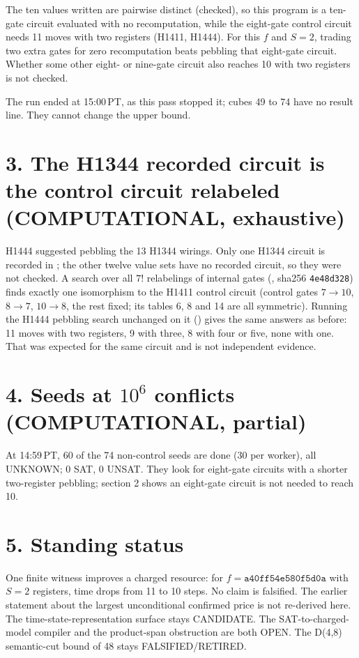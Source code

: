 \documentclass[11pt]{article}
\begin{document}
The ten values written are pairwise distinct (checked), so this program is a ten-gate circuit evaluated with no recomputation, while the eight-gate control circuit needs 11 moves with two registers (H1411, H1444). For this $f$ and $S=2$, trading two extra gates for zero recomputation beats pebbling that eight-gate circuit. Whether some other eight- or nine-gate circuit also reaches 10 with two registers is not checked.

The run ended at 15:00\,PT, as this pass stopped it; cubes 49 to 74 have no result line. They cannot change the upper bound.

\section*{3. The H1344 recorded circuit is the control circuit relabeled (COMPUTATIONAL, exhaustive)}
H1444 suggested pebbling the 13 H1344 wirings. Only one H1344 circuit is recorded in ; the other twelve value sets have no recorded circuit, so they were not checked. A search over all $7!$ relabelings of internal gates (, sha256 \texttt{4e48d328}) finds exactly one isomorphism to the H1411 control circuit (control gates $7\to10$, $8\to7$, $10\to8$, the rest fixed; its tables 6, 8 and 14 are all symmetric). Running the H1444 pebbling search unchanged on it () gives the same answers as before: 11 moves with two registers, 9 with three, 8 with four or five, none with one. That was expected for the same circuit and is not independent evidence.

\section*{4. Seeds at $10^6$ conflicts (COMPUTATIONAL, partial)}
At 14:59\,PT, 60 of the 74 non-control seeds are done (30 per worker), all UNKNOWN; 0 SAT, 0 UNSAT. They look for eight-gate circuits with a shorter two-register pebbling; section 2 shows an eight-gate circuit is not needed to reach 10.

\section*{5. Standing status}
One finite witness improves a charged resource: for $f=\texttt{a40ff54e580f5d0a}$ with $S=2$ registers, time drops from 11 to 10 steps. No claim is falsified. The earlier statement about the largest unconditional confirmed price is not re-derived here. The time-state-representation surface stays CANDIDATE. The SAT-to-charged-model compiler and the product-span obstruction are both OPEN. The D(4,8) semantic-cut bound of 48 stays FALSIFIED/RETIRED.
\end{document}
